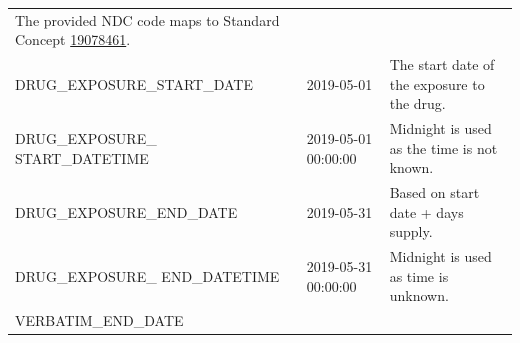 \documentclass[11pt]{book}
\theoremstyle{definition}
\theoremstyle{definition}
\theoremstyle{definition}
\theoremstyle{remark}
\begin{document}
\begin{longtable}[]{@{}lll@{}}
\begin{minipage}[t]{0.49\columnwidth}
The provided NDC code maps to Standard Concept \href{http://athena.ohdsi.org/search-terms/terms/19078461}{19078461}.\strut
\end{minipage}\tabularnewline
\begin{minipage}[t]{0.28\columnwidth}\raggedright
DRUG\_EXPOSURE\_START\_DATE\strut
\end{minipage} & \begin{minipage}[t]{0.15\columnwidth}\raggedright
2019-05-01\strut
\end{minipage} & \begin{minipage}[t]{0.49\columnwidth}\raggedright
The start date of the exposure to the drug.\strut
\end{minipage}\tabularnewline
\begin{minipage}[t]{0.28\columnwidth}\raggedright
DRUG\_EXPOSURE\_ START\_DATETIME\strut
\end{minipage} & \begin{minipage}[t]{0.15\columnwidth}\raggedright
2019-05-01 00:00:00\strut
\end{minipage} & \begin{minipage}[t]{0.49\columnwidth}\raggedright
Midnight is used as the time is not known.\strut
\end{minipage}\tabularnewline
\begin{minipage}[t]{0.28\columnwidth}\raggedright
DRUG\_EXPOSURE\_END\_DATE\strut
\end{minipage} & \begin{minipage}[t]{0.15\columnwidth}\raggedright
2019-05-31\strut
\end{minipage} & \begin{minipage}[t]{0.49\columnwidth}\raggedright
Based on start date + days supply.\strut
\end{minipage}\tabularnewline
\begin{minipage}[t]{0.28\columnwidth}\raggedright
DRUG\_EXPOSURE\_ END\_DATETIME\strut
\end{minipage} & \begin{minipage}[t]{0.15\columnwidth}\raggedright
2019-05-31 00:00:00\strut
\end{minipage} & \begin{minipage}[t]{0.49\columnwidth}\raggedright
Midnight is used as time is unknown.\strut
\end{minipage}\tabularnewline
\begin{minipage}[t]{0.28\columnwidth}\raggedright
VERBATIM\_END\_DATE\strut
\end{minipage} & \begin{minipage}[t]{0.15\columnwidth}\raggedright

\end{minipage}
\end{longtable}
\end{document}
